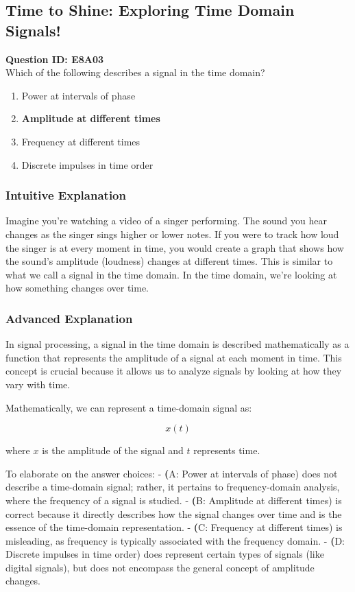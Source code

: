 \subsection{Time to Shine: Exploring Time Domain Signals!}

\begin{tcolorbox}
\textbf{Question ID: E8A03} \\
Which of the following describes a signal in the time domain?
\begin{enumerate}[label=\Alph*.]
    \item Power at intervals of phase
    \item \textbf{Amplitude at different times}
    \item Frequency at different times
    \item Discrete impulses in time order
\end{enumerate}
\end{tcolorbox}

\subsubsection{Intuitive Explanation}
Imagine you're watching a video of a singer performing. The sound you hear changes as the singer sings higher or lower notes. If you were to track how loud the singer is at every moment in time, you would create a graph that shows how the sound's amplitude (loudness) changes at different times. This is similar to what we call a signal in the time domain. In the time domain, we're looking at how something changes over time.

\subsubsection{Advanced Explanation}
In signal processing, a signal in the time domain is described mathematically as a function that represents the amplitude of a signal at each moment in time. This concept is crucial because it allows us to analyze signals by looking at how they vary with time.

Mathematically, we can represent a time-domain signal as:

\[
x(t)
\]

where \( x \) is the amplitude of the signal and \( t \) represents time. 

To elaborate on the answer choices:
- \textbf(A: Power at intervals of phase) does not describe a time-domain signal; rather, it pertains to frequency-domain analysis, where the frequency of a signal is studied.
- \textbf(B: Amplitude at different times) is correct because it directly describes how the signal changes over time and is the essence of the time-domain representation.
- \textbf(C: Frequency at different times) is misleading, as frequency is typically associated with the frequency domain.
- \textbf(D: Discrete impulses in time order) does represent certain types of signals (like digital signals), but does not encompass the general concept of amplitude changes.

